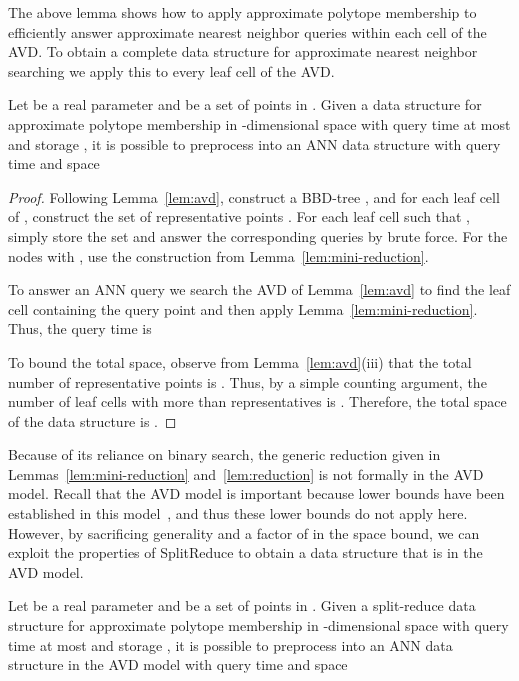 \documentclass[11pt]{article}   \usepackage[letterpaper,hmargin=2.1cm,vmargin=3cm]{geometry}
\newcommand{\alg}{\textrm{SplitReduce}}
\begin{document}
The above lemma shows how to apply approximate polytope membership to efficiently answer approximate nearest neighbor queries within each cell of the AVD. To obtain a complete data structure for approximate nearest neighbor searching we apply this to every leaf cell of the AVD.

\begin{lemma} \label{lem:reduction}
Let  be a real parameter and  be a set of  points in . Given a data structure for approximate polytope membership in -dimensional space with query time at most  and storage , it is possible to preprocess  into an ANN data structure with query time  and space

\end{lemma}


\begin{proof}
Following Lemma~\ref{lem:avd}, construct a BBD-tree , and for each leaf cell  of , construct the set of representative points . For each leaf cell such that , simply store the set  and answer the corresponding queries by brute force. For the nodes with , use the construction from Lemma~\ref{lem:mini-reduction}. 

To answer an ANN query we search the AVD of Lemma~\ref{lem:avd} to find the leaf cell containing the query point and then apply Lemma~\ref{lem:mini-reduction}. Thus, the query time is 

To bound the total space, observe from Lemma~\ref{lem:avd}(iii) that the total number of representative points is . Thus, by a simple counting argument, the number of leaf cells with more than  representatives is . Therefore, the total space of the data structure is .
\end{proof}


Because of its reliance on binary search, the generic reduction given in Lemmas~\ref{lem:mini-reduction} and~\ref{lem:reduction} is not formally in the AVD model. Recall that the AVD model is important because lower bounds have been established in this model~\cite{AVD-JACM}, and thus these lower bounds do not apply here. However, by sacrificing generality and a factor of  in the space bound, we can exploit the properties of {\alg} to obtain a data structure that is in the AVD model.

\begin{lemma} \label{lem:avd-model}
Let  be a real parameter and  be a set of  points in . Given a split-reduce data structure for approximate polytope membership in -dimensional space with query time at most  and storage , it is possible to preprocess  into an ANN data structure in the AVD model with query time  and space

\end{lemma}
\end{document}
